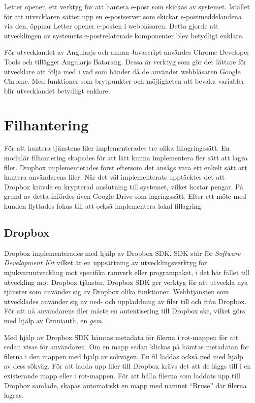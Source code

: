 Letter opener, ett verktyg för att hantera e-post som skickas av systemet. Istället för att utvecklaren sätter upp en e-postserver som skickar e-postmeddelandena via den, öppnar Letter opener e-posten i webbläsaren. Detta gjorde att utvecklingen av systemets e-postrelaterade komponenter blev betydligt enklare.

För utvecklandet av Angularjs och annan Javascript användes Chrome Developer Tools och tillägget Angularjs Batarang. Dessa är verktyg som gör det lättare för utvecklare att följa med i vad som händer då de använder webbläsaren Google Chrome. Med funktioner som brytpunkter och möjligheten att bevaka variabler blir utvecklandet betydligt enklare.

\section{Filhantering}
För att hantera tjänstens filer implementerades tre olika fillagringssätt. En modulär filhantering skapades för att lätt kunna implementera fler sätt att lagra filer. Dropbox implementerades först eftersom det ansågs vara ett enkelt sätt att hantera användarens filer. När det väl implementerats upptäcktes det att Dropbox krävde en krypterad anslutning till systemet, vilket kostar pengar. På grund av detta infördes även Google Drive som lagringssätt. Efter ett möte med kunden flyttades fokus till att också implementera lokal fillagring. 

\subsection{Dropbox}
Dropbox implementerades med hjälp av Dropbox SDK. SDK står för \textit{Software Development Kit} vilket är en uppsättning av utvecklingsverktyg för mjukvaruutveckling mot specifika ramverk eller programpaket, i det här fallet till utveckling mot Dropbox tjänster. Dropbox SDK ger verktyg för att utveckla nya tjänster som använder sig av Dropbox olika funktioner. Webbtjänsten som utvecklades använder sig av ned- och uppladdning av filer till och från Dropbox. För att nå användarens filer måste en autentisering till Dropbox ske, vilket görs med hjälp av Omniauth, en \textit{gem}.

Med hjälp av Dropbox SDK hämtas metadata för filerna i rot-mappen för att sedan visas för användaren. Om en mapp sedan klickas på hämtas metadatan för filerna i den mappen med hjälp av sökvägen. En fil laddas också ned med hjälp av dess sökväg. För att ladda upp filer till Dropbox krävs det att de läggs till i en existerande mapp eller i rot-mappen. För att hålla filerna som laddats upp till Dropbox samlade, skapas automatiskt en mapp med namnet “Bruse” där filerna lagras. 

